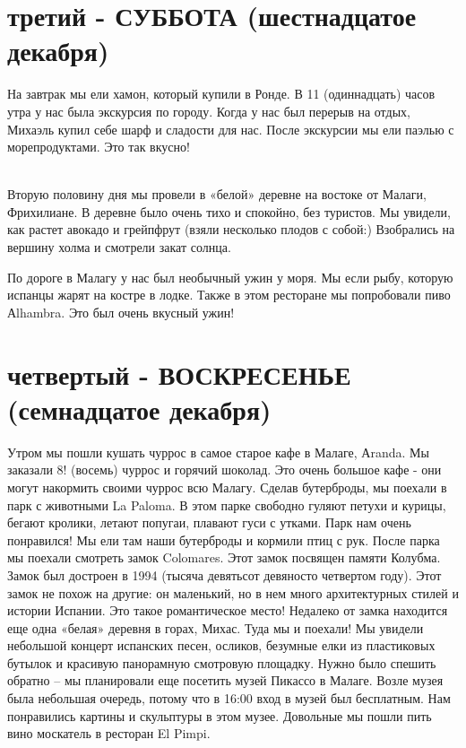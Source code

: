 \documentclass[a4paper]{article}
\begin{document}
\section{третий - СУББОТА (шестнадцатое декабря)}
На завтрак мы ели хамон, который купили в Ронде. В 11 (одиннадцать) часов утра у нас была экскурсия по городу. Когда у нас был перерыв на отдых, Михаэль купил себе шарф и сладости для нас. После экскурсии мы ели паэлью с морепродуктами. Это так вкусно! 
\begin{figure}[h!]\centering
\end{figure}\\
Вторую половину дня мы провели в «белой» деревне на востоке от Малаги, Фрихилиане. В деревне было очень тихо и спокойно, без туристов. Мы увидели, как растет авокадо и грейпфрут (взяли несколько плодов с собой:) Взобрались на вершину холма и смотрели закат солнца.
\newpage
\begin{figure}[h!]\centering
\end{figure}\noindent
По дороге в Малагу у нас был необычный ужин у моря. Мы если рыбу, которую испанцы жарят на костре в лодке. Также в этом ресторане мы попробовали пиво Аlhambra. Это был очень вкусный ужин!

\section{четвертый - ВОСКРЕСЕНЬЕ (семнадцатое декабря)}
Утром мы пошли кушать чуррос в самое старое кафе в Малаге, Аranda. Мы заказали 8! (восемь) чуррос и горячий шоколад. Это очень большое кафе - они могут накормить своими чуррос всю Малагу. Сделав бутерброды, мы поехали в парк с животными La Paloma. В этом парке свободно гуляют петухи и курицы, бегают кролики, летают попугаи, плавают гуси с утками. Парк нам очень понравился! Мы ели там наши бутерброды и кормили птиц с рук. После парка мы поехали смотреть замок Colomares. Этот замок посвящен памяти Колубма. Замок был достроен в 1994 (тысяча девятьсот девяносто четвертом году). Этот замок не похож на другие: он маленький, но в нем много архитектурных стилей и истории Испании. Это такое романтическое место! 
Недалеко от замка находится еще одна «белая» деревня в горах, Михас. Туда мы и поехали! Мы увидели небольшой концерт испанских песен, осликов, безумные елки из пластиковых бутылок и красивую панорамную смотровую площадку. Нужно было спешить обратно – мы планировали еще посетить музей Пикассо в Малаге. Возле музея была небольшая очередь, потому что в 16:00 вход в музей был бесплатным. Нам понравились картины и скульптуры в этом музее. Довольные мы пошли пить вино москатель в ресторан El Pimpi. 
\end{document}
